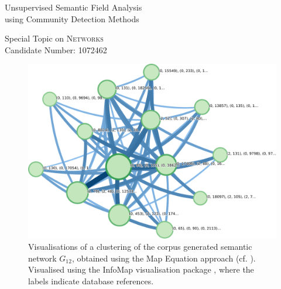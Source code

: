 \documentclass[12pt, a4paper]{article}
\title{\topictitle}
\author{Candidate \candidatenumber}
\date{\today}
\newcommand{\topictitle}{Unsupervised Semantic Field Analysis \\ \large using Community Detection Methods}
\newcommand{\candidatenumber}{1072462}
\newcommand{\course}{Networks}
\begin{document}
  \pagestyle{plain}
  \begin{center}
    \vspace*{-2.5cm}
    \Large \topictitle \\
    \vspace{.3cm}

    \normalsize Special Topic on \textcolor{themecolor3}{\textsc{\course}}\\
    \normalsize Candidate Number: \textcolor{themecolor3}{\candidatenumber}
    \vspace{.3cm}
  \end{center}

  \begin{abstract}
    \label{abstract}
    In this work we will attempt to compare methods in the domain of semantic field tagging by considering a language corpus as a large graph of neighbouring words. The network is built by performing part-of-speech tagging iteratively on the entire corpus and linking together principal words that are connected in a neighbouring sense up to a radius of $r$ words.
    The resulting graph $G_r$ is then analysed using community detection methods such as \textit{Louvain Clustering}, \textit{Chinese Whispers}, \textit{Clauset Greedy Modularity} and other clustering approaches which we only discuss briefly.
    We derive the gain in modularity presented in the original work \cite{lambiotte-louvain-clustering} upon atomic modification of the clusters $\{C_i\}_{i=1}^{n_C}$.
    The Chinese Whispers algorithm is a simple graph clustering method originating from research in Natural Language Processing \parencite{cw-biemann} and it is well-established for semantic field analysis.
    The abovementioned algorithms are applied to a real-world corpus of the Latin language, working with a graph of 10843 nodes and 2.4 million edges.
    We compare them in terms of output modularity, runtime and number of clusters on the graphs introduced, which we compare to the eigengap in the spectrum of the graph Laplacian.
  \end{abstract}

  \begin{figure}[H]
    \centering
    \includegraphics[width=0.65\linewidth]{figures/library-graph-12.pajek.ftree.pdf}
    \caption{Visualisations of a clustering of the corpus generated semantic network $G_{12}$, obtained using the Map Equation approach (cf. ). Visualised using the InfoMap visualisation package \parencite{mapequation}, where the labels indicate database references.}
    \label{fig:mapequation}
  \end{figure}
\end{document}
